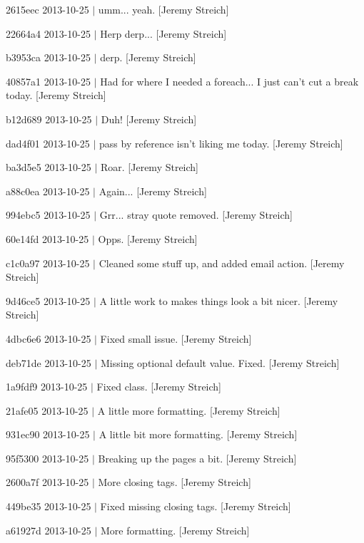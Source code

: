 \begin{DoxyItemize}
\item 2615eec 2013-\/10-\/25 $|$ umm... yeah. \mbox{[}Jeremy Streich\mbox{]}
\item 22664a4 2013-\/10-\/25 $|$ Herp derp... \mbox{[}Jeremy Streich\mbox{]}
\item b3953ca 2013-\/10-\/25 $|$ derp. \mbox{[}Jeremy Streich\mbox{]}
\item 40857a1 2013-\/10-\/25 $|$ Had for where I needed a foreach... I just can't cut a break today. \mbox{[}Jeremy Streich\mbox{]}
\item b12d689 2013-\/10-\/25 $|$ Duh! \mbox{[}Jeremy Streich\mbox{]}
\item dad4f01 2013-\/10-\/25 $|$ pass by reference isn't liking me today. \mbox{[}Jeremy Streich\mbox{]}
\item ba3d5e5 2013-\/10-\/25 $|$ Roar. \mbox{[}Jeremy Streich\mbox{]}
\item a88c0ea 2013-\/10-\/25 $|$ Again... \mbox{[}Jeremy Streich\mbox{]}
\item 994ebc5 2013-\/10-\/25 $|$ Grr... stray quote removed. \mbox{[}Jeremy Streich\mbox{]}
\item 60e14fd 2013-\/10-\/25 $|$ Opps. \mbox{[}Jeremy Streich\mbox{]}
\item c1c0a97 2013-\/10-\/25 $|$ Cleaned some stuff up, and added email action. \mbox{[}Jeremy Streich\mbox{]}
\item 9d46ce5 2013-\/10-\/25 $|$ A little work to makes things look a bit nicer. \mbox{[}Jeremy Streich\mbox{]}
\item 4dbc6e6 2013-\/10-\/25 $|$ Fixed small issue. \mbox{[}Jeremy Streich\mbox{]}
\item deb71de 2013-\/10-\/25 $|$ Missing optional default value. Fixed. \mbox{[}Jeremy Streich\mbox{]}
\item 1a9fdf9 2013-\/10-\/25 $|$ Fixed class. \mbox{[}Jeremy Streich\mbox{]}
\item 21afe05 2013-\/10-\/25 $|$ A little more formatting. \mbox{[}Jeremy Streich\mbox{]}
\item 931ec90 2013-\/10-\/25 $|$ A little bit more formatting. \mbox{[}Jeremy Streich\mbox{]}
\item 95f5300 2013-\/10-\/25 $|$ Breaking up the pages a bit. \mbox{[}Jeremy Streich\mbox{]}
\item 2600a7f 2013-\/10-\/25 $|$ More closing tags. \mbox{[}Jeremy Streich\mbox{]}
\item 449be35 2013-\/10-\/25 $|$ Fixed missing closing tags. \mbox{[}Jeremy Streich\mbox{]}
\item a61927d 2013-\/10-\/25 $|$ More formatting. \mbox{[}Jeremy Streich\mbox{]}

\end{DoxyItemize}
